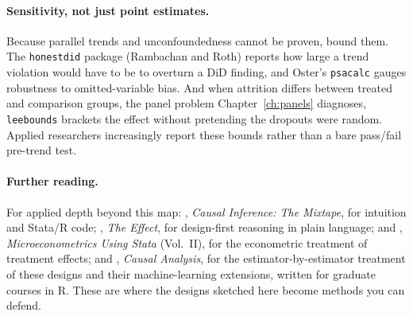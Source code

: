 \documentclass[
    a4paper,
    fontsize=10pt,
    twoside=true,
    numbers=noenddot,
]{kaobook}
\begin{document}
\paragraph{Sensitivity, not just point estimates.} Because parallel trends and unconfoundedness cannot be proven, bound them. The \texttt{honestdid} package (Rambachan and Roth) reports how large a trend violation would have to be to overturn a DiD finding, and Oster's \texttt{psacalc} gauges robustness to omitted-variable bias. And when attrition differs between treated and comparison groups, the panel problem Chapter~\ref{ch:panels} diagnoses, \texttt{leebounds} \parencite{lee2009bounds,tauchmann2014leebounds} brackets the effect without pretending the dropouts were random. Applied researchers increasingly report these bounds rather than a bare pass/fail pre-trend test.

\paragraph{Further reading.} For applied depth beyond this map: \textcite{cunningham2021mixtape}, \emph{Causal Inference: The Mixtape}, for intuition and Stata/R code; \textcite{huntingtonklein2022effect}, \emph{The Effect}, for design-first reasoning in plain language; and \textcite{cameron2022microeconometrics}, \emph{Microeconometrics Using Stata} (Vol.~II), for the econometric treatment of treatment effects; and \textcite{huber2023causal}, \emph{Causal Analysis}, for the estimator-by-estimator treatment of these designs and their machine-learning extensions, written for graduate courses in R. These are where the designs sketched here become methods you can defend.

\end{document}
